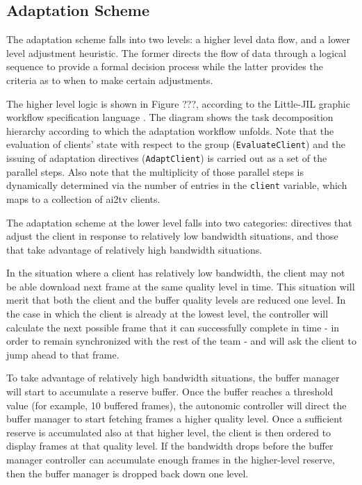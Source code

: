 \documentclass{sig-alternate}
\begin{document}
\subsection{Adaptation Scheme}

The adaptation scheme falls into two levels: a higher level data flow,
and a lower level adjustment heuristic.  The former directs the flow
of data through a logical sequence to provide a formal decision
process while the latter provides the criteria as to when to make
certain adjustments.

The higher level logic is shown in Figure ???, according to the
Little-JIL graphic workflow specification language \cite{L-JIL}.  The
diagram shows the task decomposition hierarchy according to which the
adaptation workflow unfolds.  Note that the evaluation of clients'
state with respect to the group (\texttt{EvaluateClient}) and the
issuing of adaptation directives (\texttt{AdaptClient}) is carried out
as a set of the parallel steps.  Also note that the multiplicity of
those parallel steps is dynamically determined via the number of
entries in the \texttt{client} variable, which maps to a collection of
ai2tv clients.

%
%

The adaptation scheme at the lower level falls into two categories:
directives that adjust the client in response to relatively low
bandwidth situations, and those that take advantage of relatively high
bandwidth situations.

In the situation where a client has relatively low bandwidth, the
client may not be able download next frame at the same quality level
in time.  This situation will merit that both the client and the
buffer quality levels are reduced one level. In the case in which the
client is already at the lowest level, the controller will calculate
the next possible frame that it can successfully complete in time - in
order to remain synchronized with the rest of the team - and will ask
the client to jump ahead to that frame.

To take advantage of relatively high bandwidth situations, the buffer
manager will start to accumulate a reserve buffer.  Once the buffer
reaches a threshold value (for example, 10 buffered frames), the
autonomic controller will direct the buffer manager to start fetching
frames a higher quality level.  Once a sufficient reserve is
accumulated also at that higher level, the client is then ordered to
display frames at that quality level.  If the bandwidth drops before
the buffer manager controller can accumulate enough frames in the
higher-level reserve, then the buffer manager is dropped back down one
level.
\end{document}

